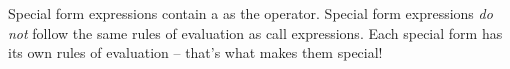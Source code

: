 Special form expressions contain a  as the operator.
Special form expressions \emph{do not} follow the same rules of evaluation as
call expressions.  Each special form has its own rules of evaluation -- that's
what makes them special!
